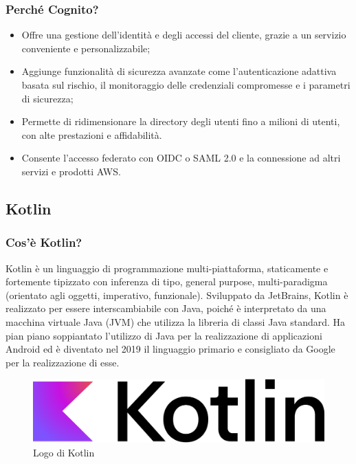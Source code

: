             \subsubsection{Perché Cognito? \cite{AWS5}}
            \begin{itemize}
                \item Offre una gestione dell'identità e degli accessi del cliente, grazie a un servizio conveniente e personalizzabile;
                \item Aggiunge funzionalità di sicurezza avanzate come l'autenticazione adattiva basata sul rischio, il monitoraggio delle credenziali compromesse e i parametri di sicurezza;
                \item Permette di ridimensionare la directory degli utenti fino a milioni di utenti, con alte prestazioni e affidabilità.
                \item Consente l'accesso federato con OIDC o SAML 2.0 e la connessione ad altri servizi e prodotti AWS.
            \end{itemize}
           
        \subsection{Kotlin}
            \subsubsection{Cos'è Kotlin? \cite{Wikipedia2}}
                Kotlin è un linguaggio di programmazione multi-piattaforma, staticamente e fortemente tipizzato con inferenza di tipo, general purpose, multi-paradigma (orientato agli oggetti, imperativo, funzionale). Sviluppato da JetBrains, Kotlin è realizzato per essere interscambiabile con Java, poiché è interpretato da una macchina virtuale Java (JVM) che utilizza la libreria di classi Java standard. Ha pian piano soppiantato l'utilizzo di Java per la realizzazione di applicazioni Android ed è diventato nel 2019 il linguaggio primario e consigliato da Google per la realizzazione di esse.
            \begin{figure}[htbp!]
                \centering
                \includegraphics[width=0.5\linewidth]{Immagini/System Design/Kotlin.png}
                \caption{Logo di Kotlin}
            \end{figure}
